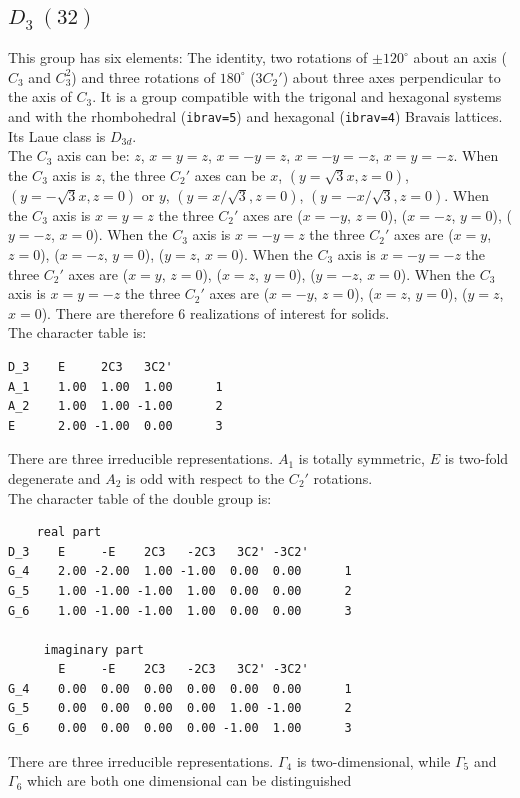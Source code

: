 \documentclass[12pt,a4paper]{article}
\begin{document}
\subsection{\color{web-blue}$D_3\ (32)$}
This group has six elements: The identity, two rotations of $\pm120^\circ$ about
an axis ($C_3$ and $C_3^2$) and three rotations of $180^\circ$ 
($3C_2'$) about three axes perpendicular to the axis of $C_3$.
It is a group compatible with the trigonal and hexagonal systems and with the
rhombohedral (\texttt{ibrav=5}) and hexagonal (\texttt{ibrav=4})
Bravais lattices. \\ 
Its Laue class is $D_{3d}$. \\
The $C_3$ axis can be: $z$, $x=y=z$, $x=-y=z$, $x=-y=-z$, $x=y=-z$.
When the $C_3$ axis is $z$, the three $C_2'$ axes can be
$x$, $(y=\sqrt{3}x, z=0)$, $(y=-\sqrt{3}x, z=0)$ or 
$y$, $(y=x/\sqrt{3}, z=0)$, $(y=-x/\sqrt{3}, z=0)$. 
When the $C_3$ axis is $x=y=z$ the three $C_2'$ axes are
($x=-y$, $z=0$), ($x=-z$, $y=0$), ($y=-z$, $x=0$).
When the $C_3$ axis is $x=-y=z$ the three $C_2'$ axes are
($x=y$, $z=0$), ($x=-z$, $y=0$), ($y=z$, $x=0$).
When the $C_3$ axis is $x=-y=-z$ the three $C_2'$ axes are
($x=y$, $z=0$), ($x=z$, $y=0$), ($y=-z$, $x=0$).
When the $C_3$ axis is $x=y=-z$ the three $C_2'$ axes are
($x=-y$, $z=0$), ($x=z$, $y=0$), ($y=z$, $x=0$). 
There are therefore $6$ realizations of interest for solids. \\
The character table is:
\begin{verbatim}
D_3    E     2C3   3C2'
A_1    1.00  1.00  1.00      1
A_2    1.00  1.00 -1.00      2
E      2.00 -1.00  0.00      3
\end{verbatim}
There are three irreducible representations. $A_1$ is totally symmetric,
$E$ is two-fold degenerate and $A_2$ is odd with respect to the
$C_2'$ rotations.\\
The character table of the double group is:
\begin{verbatim}
    real part
D_3    E     -E    2C3   -2C3   3C2' -3C2'
G_4    2.00 -2.00  1.00 -1.00  0.00  0.00      1
G_5    1.00 -1.00 -1.00  1.00  0.00  0.00      2
G_6    1.00 -1.00 -1.00  1.00  0.00  0.00      3

     imaginary part
       E     -E    2C3   -2C3   3C2' -3C2'
G_4    0.00  0.00  0.00  0.00  0.00  0.00      1
G_5    0.00  0.00  0.00  0.00  1.00 -1.00      2
G_6    0.00  0.00  0.00  0.00 -1.00  1.00      3
\end{verbatim}
There are three irreducible representations. $\Gamma_4$ is two-dimensional,
while $\Gamma_5$ and $\Gamma_6$ which are both one dimensional can be distinguished
\end{document}

